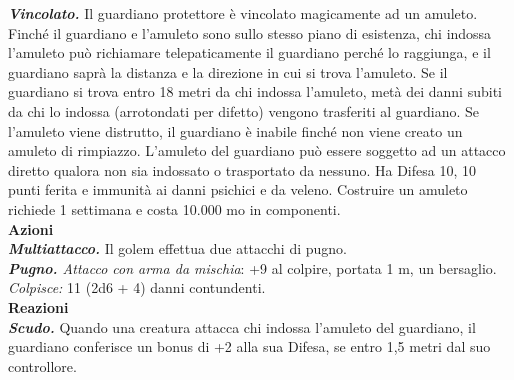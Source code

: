 \begin{multicols}{2}
\emph{\textbf{Vincolato.}} Il guardiano protettore è vincolato magicamente ad un amuleto. Finché il guardiano e l'amuleto sono sullo stesso piano di esistenza, chi indossa l'amuleto può richiamare telepaticamente il guardiano perché lo raggiunga, e il guardiano saprà la distanza e la direzione in cui si trova l'amuleto. Se il guardiano si trova entro 18 metri da chi indossa l'amuleto, metà dei danni subiti da chi lo indossa (arrotondati per difetto) vengono trasferiti al guardiano. Se l'amuleto viene distrutto, il guardiano è inabile finché non viene creato un amuleto di rimpiazzo. L'amuleto del guardiano può essere soggetto ad un attacco diretto qualora non sia indossato o trasportato da nessuno. Ha Difesa 10, 10 punti ferita e immunità ai danni psichici e da veleno. Costruire un amuleto richiede 1 settimana e costa 10.000 mo in componenti.\\
\smallskip\textbf{Azioni}\\
\emph{\textbf{Multiattacco.}} Il golem effettua due attacchi di pugno.\\
\emph{\textbf{Pugno.} Attacco con arma da mischia}: +9 al colpire, portata 1 m, un bersaglio.\\
\emph{Colpisce:} 11 (2d6 + 4) danni contundenti.\\
\textbf{Reazioni}\\
\emph{\textbf{Scudo.}} Quando una creatura attacca chi indossa l'amuleto del guardiano, il guardiano conferisce un bonus di +2 alla sua Difesa, se entro 1,5 metri dal suo controllore.\\


\end{multicols}
